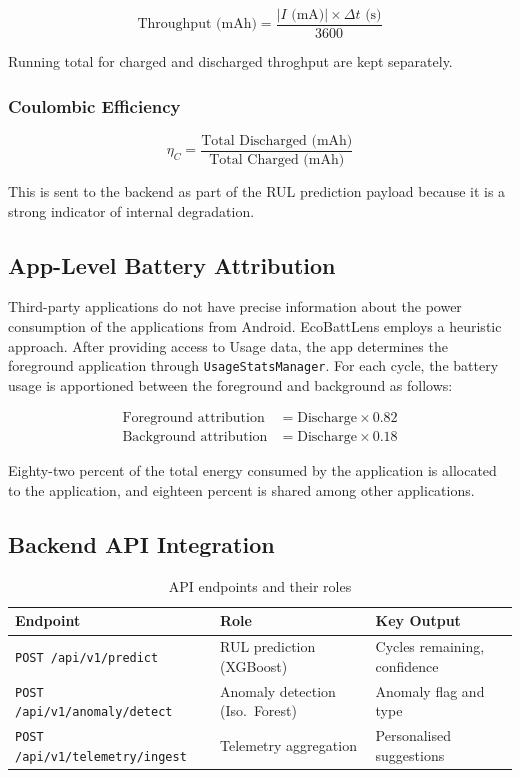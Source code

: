 \documentclass[12pt,a4paper]{report}
\begin{document}
\begin{equation}
  \text{Throughput (mAh)} = \frac{|I \text{ (mA)}| \times \Delta t \text{ (s)}}{3600}
\end{equation}

Running total for charged and discharged throghput are kept separately.

\subsubsection{Coulombic Efficiency}

\begin{equation}
  \eta_C = \frac{\text{Total Discharged (mAh)}}{\text{Total Charged (mAh)}}
\end{equation}

This is sent to the backend as part of the RUL prediction payload because it is a
strong indicator of internal degradation.

\subsection{App-Level Battery Attribution}

Third-party applications do not have precise information about the power consumption of the applications from Android.
EcoBattLens employs a heuristic approach. After providing access to Usage data,
the app determines the foreground application through
\texttt{UsageStatsManager}. For each cycle, the battery usage is apportioned between the foreground and background as follows:

\begin{align}
  \text{Foreground attribution} &= \text{Discharge} \times 0.82\\
  \text{Background attribution} &= \text{Discharge} \times 0.18
\end{align}

Eighty-two percent of the total energy consumed by the application is allocated to the application, and eighteen percent is shared among other applications.

\subsection{Backend API Integration}

\begin{table}[H]
\caption{API endpoints and their roles}
\centering
\small
\begin{tabular}{lll}
\toprule
\textbf{Endpoint} & \textbf{Role} & \textbf{Key Output}\\
\midrule
\texttt{POST /api/v1/predict}         & RUL prediction (XGBoost)        & Cycles remaining, confidence\\
\texttt{POST /api/v1/anomaly/detect}  & Anomaly detection (Iso.\ Forest) & Anomaly flag and type\\
\texttt{POST /api/v1/telemetry/ingest}& Telemetry aggregation            & Personalised suggestions\\
\bottomrule
\end{tabular}
\end{table}
\end{document}
